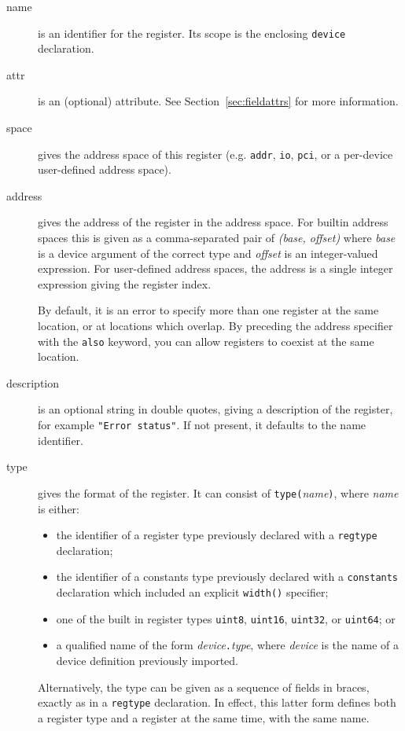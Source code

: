 \documentclass[a4paper,11pt,twoside]{report}
\begin{document}
\begin{description}

\item[name] is an identifier for the register.  Its scope is the
  enclosing \texttt{device} declaration. 

\item[attr] is an (optional) attribute.  See
  Section~\ref{sec:fieldattrs} for more information.

\item[space] gives the address space of this register
  (e.g. \texttt{addr}, \texttt{io}, \texttt{pci}, or a per-device
  user-defined address space).

\item[address] gives the address of the register in the address
  space.  For builtin address spaces this is given as a
  comma-separated pair of \textit{(base, offset)} where \textit{base}
  is a device argument of the correct type and \textit{offset} is an
  integer-valued \Mac expression.   For user-defined address spaces,
  the address is a single \Mac integer expression giving the register
  index.  

  By default, it is an error to specify more than one
  register at the same location, or at locations which overlap.  By
  preceding the address specifier with the \texttt{also} keyword, you
  can allow registers to coexist at the same location. 

\item[description] is an optional string in double quotes, giving a
  description of the register, for example \texttt{"Error status"}. 
  If not present, it defaults to the name identifier.  

\item[type] gives the format of the register.  It can consist of
  \texttt{type(}\textit{name}\texttt{)}, where \textit{name} is
  either:
  \begin{itemize}
  \item the identifier of a register type previously declared with a
    \texttt{regtype} declaration;
  \item the identifier of a constants type previously declared with a
    \texttt{constants} declaration which included an explicit
    \texttt{width()} specifier;
  \item one of the built in register types \texttt{uint8},
    \texttt{uint16}, \texttt{uint32}, or \texttt{uint64}; or
  \item a qualified name of the form
    \textit{device}\texttt{.}\textit{type}, where \textit{device}
    is the name of a device definition previously imported.  
  \end{itemize}

  Alternatively, the type can be given as a sequence of fields in
  braces, exactly as in a \texttt{regtype} declaration.  In effect,
  this latter form defines both a register type and a register at the
  same time, with the same name. 

\end{description}
\end{document}
